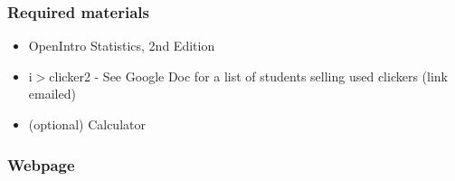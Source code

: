 \documentclass[11pt,containsverbatim,handout,xcolor=xelatex,dvipsnames,table]{beamer}
\begin{document}
\begin{frame}
\frametitle{Required materials}

\begin{itemize}

\item OpenIntro Statistics, 2nd Edition

\item i$>$clicker2 - See Google Doc for a list of students selling used clickers (link emailed)

\item (optional) Calculator

\end{itemize}

\end{frame}


\begin{frame}
\frametitle{Webpage}

\vfill

\centering
{\Large 
{}
}

\vfill

\end{frame}

\end{document}
